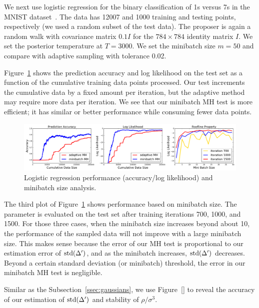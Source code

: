 \documentclass{article}
\begin{document}
We next use logistic regression for the binary classification of 1s versus 7s in the MNIST
dataset~\cite{lecun-mnisthandwrittendigit-2010}. The data has 12007 and 1000 training and testing
points, respectively (we used a random subset of the test data). The proposer is again a random walk
with covariance matrix $0.1I$ for the $784\times 784$ identity matrix $I$. We set the posterior
temperature at $T=3000$. We set the minibatch size $m=50$ and compare with adaptive sampling with
tolerance 0.02.

Figure~\ref{fig:logistic_fig} shows the prediction accuracy and log likelihood on the test set as a
function of the cumulative training data points processed. Our test increments the cumulative data
by a fixed amount per iteration, but the adaptive method may require more data per iteration.  We
see that our minibatch MH test is more efficient; it has similar or better performance while
consuming fewer data points.

\begin{figure}[t]
    \centering
    \includegraphics[width=1\linewidth]{exp2.png}
    \caption{Logistic regression performance (accuracy/log likelihood) and minibatch size analysis.}
    \label{fig:logistic_fig}
    \vspace{-10pt}
\end{figure}

The third plot of Figure~\ref{fig:logistic_fig} shows performance based on minibatch size. The
parameter is evaluated on the test set after training iterations 700, 1000, and 1500. For those
three cases, when the minibatch size increases beyond about 10, the performance of the sampled data
will not improve with a large minibatch size. This makes sense because the error of our MH test is
proportional to our estimation error of ${\rm std}(\Delta')$, and as the minibatch increases, ${\rm
std}(\Delta')$ decreases. Beyond a certain standard deviation (or minibatch) threshold, the error in
our minibatch MH test is negligible.

Similar as the Subsection~\ref{ssec:gaussians}, we use Figure~\ref{} to reveal the accuracy of our estimation of ${\rm std}(\Delta')$ and stability of $\rho/\sigma^3$.
\end{document}
